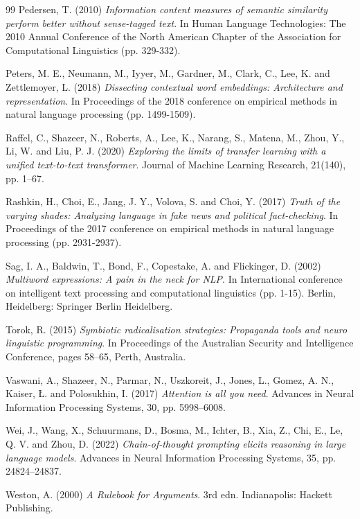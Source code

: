 \documentclass[12pt, a4paper]{article}
\begin{document}
\begin{thebibliography}{99}
 Pedersen, T. (2010) \textit{Information content measures of semantic similarity perform better without sense-tagged text}. In Human Language Technologies: The 2010 Annual Conference of the North American Chapter of the Association for Computational Linguistics (pp. 329-332).

 Peters, M. E., Neumann, M., Iyyer, M., Gardner, M., Clark, C., Lee, K. and Zettlemoyer, L. (2018) \textit{Dissecting contextual word embeddings: Architecture and representation}. In Proceedings of the 2018 conference on empirical methods in natural language processing (pp. 1499-1509).

 Raffel, C., Shazeer, N., Roberts, A., Lee, K., Narang, S., Matena, M., Zhou, Y., Li, W. and Liu, P. J. (2020) \textit{Exploring the limits of transfer learning with a unified text-to-text transformer}. Journal of Machine Learning Research, 21(140), pp. 1–67.

 Rashkin, H., Choi, E., Jang, J. Y., Volova, S. and Choi, Y. (2017) \textit{Truth of the varying shades: Analyzing language in fake news and political fact-checking}. In Proceedings of the 2017 conference on empirical methods in natural language processing (pp. 2931-2937).

 Sag, I. A., Baldwin, T., Bond, F., Copestake, A. and Flickinger, D. (2002) \textit{Multiword expressions: A pain in the neck for NLP}. In International conference on intelligent text processing and computational linguistics (pp. 1-15). Berlin, Heidelberg: Springer Berlin Heidelberg.

 Torok, R. (2015) \textit{Symbiotic radicalisation strategies: Propaganda tools and neuro linguistic programming}. In Proceedings of the Australian Security and Intelligence Conference, pages 58–65, Perth, Australia.

 Vaswani, A., Shazeer, N., Parmar, N., Uszkoreit, J., Jones, L., Gomez, A. N., Kaiser, Ł. and Polosukhin, I. (2017) \textit{Attention is all you need}. Advances in Neural Information Processing Systems, 30, pp. 5998–6008.

 Wei, J., Wang, X., Schuurmans, D., Bosma, M., Ichter, B., Xia, Z., Chi, E., Le, Q. V. and Zhou, D. (2022) \textit{Chain-of-thought prompting elicits reasoning in large language models}. Advances in Neural Information Processing Systems, 35, pp. 24824–24837.

 Weston, A. (2000) \textit{A Rulebook for Arguments}. 3rd edn. Indianapolis: Hackett Publishing.

\end{thebibliography}
\end{document}
